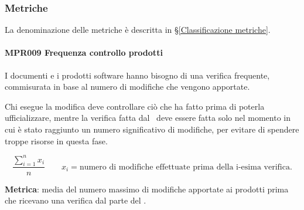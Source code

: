 

	\subsubsection{Metriche}
	La denominazione delle metriche è descritta in \S\ref{Classificazione metriche}.

		\paragraph{MPR009 Frequenza controllo prodotti}
		I documenti e i prodotti software hanno bisogno di una verifica frequente, commisurata in base al numero di modifiche che vengono apportate.

		Chi esegue la modifica deve controllare ciò che ha fatto prima di poterla ufficializzare, mentre la verifica fatta dal \Ver\ deve essere
		fatta solo nel momento in cui è stato raggiunto un numero significativo di modifiche, per evitare di spendere troppe risorse in questa fase.

		\[\dfrac{\sum_{i=1}^{n} x_i}{n} \qquad x_i=\text{numero di modifiche effettuate prima della i-esima verifica.}\]

		\textbf{Metrica}: media del numero massimo di modifiche apportate ai prodotti prima che ricevano una verifica dal parte del \Ver.
